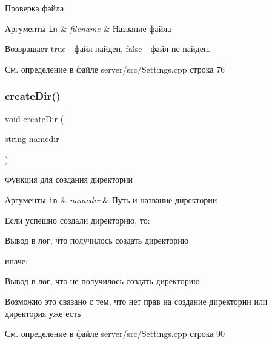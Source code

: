 Проверка файла 


\begin{DoxyParams}[1]{Аргументы}
\mbox{\tt in}  & {\em filename} & Название файла \\
\hline
\end{DoxyParams}
\begin{DoxyReturn}{Возвращает}
true -\/ файл найден, false -\/ файл не найден. 
\end{DoxyReturn}


См. определение в файле server/src/\+Settings.\+cpp строка 76

\mbox{\label{group__settingscpp_ga5ac0cd45ecb6e65e3ace40687d6ee8bc}} 
\subsubsection{\texorpdfstring{create\+Dir()}{createDir()}}
{\footnotesize\ttfamily void create\+Dir (\begin{DoxyParamCaption}\item[{string}]{namedir }\end{DoxyParamCaption})}



Функция для создания директории 


\begin{DoxyParams}[1]{Аргументы}
\mbox{\tt in}  & {\em namedir} & Путь и название директории \\
\hline
\end{DoxyParams}
Если успешно создали директорию, то\+: \begin{DoxyVerb}Вывод в лог, что получилось создать директорию
\end{DoxyVerb}


иначе\+: \begin{DoxyVerb}Вывод в лог, что не получилось создать директорию

Возможно это связано с тем, что нет прав на создание директории или директория уже есть  \end{DoxyVerb}


См. определение в файле server/src/\+Settings.\+cpp строка 90

\mbox{\label{group__settingscpp_ga8f34a2030acfb5567678ab2bba25f3c1}} 
